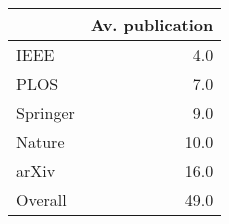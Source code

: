 \begin{tabular}{lr}
\toprule
{} &  Av. publication \\
\midrule
IEEE     &              4.0 \\
PLOS     &              7.0 \\
Springer &              9.0 \\
Nature   &             10.0 \\
arXiv    &             16.0 \\
Overall  &             49.0 \\
\bottomrule
\end{tabular}
